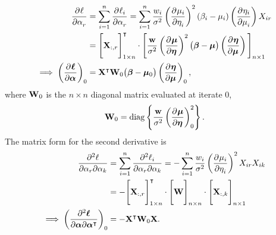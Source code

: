 \begin{align*}
  \frac{\partial^{} \ell}{\partial \alpha_r^{} } &= \sum_{i=1}^n \frac{\partial^{} \ell_i}{\partial \alpha_r^{} } = \sum_{i=1}^n \frac{w_i}{\sigma^2} \left( \frac{\partial^{} \mu_i}{\partial \eta_i^{} } \right)^2 \left(\beta_i - \mu_i\right) \left( \frac{\partial^{} \eta_i}{\partial \mu_i^{} } \right) X_{ir} \\
  &= \Bigg[ \mathbf{X}_{:,r} \Bigg]_{1 \times n}^\intercal \cdot \Bigg[ \frac{\mathbf{w}}{\sigma^2} \left( \frac{\partial^{} \bm{\mu}}{\partial \bm{\eta}^{} } \right)^2 \big(\bm{\beta} - \bm{\mu}\big) \left( \frac{\partial^{} \bm{\eta}}{\partial \bm{\mu}^{} } \right) \Bigg]_{n \times 1} \\
  \implies \left( \frac{\partial^{} \bm{\ell}}{\partial \bm{\alpha}^{} } \right)_0 &= \mathbf{X}^\intercal \mathbf{W}_0 \big(\bm{\beta} - \bm{\mu}_0\big) \left( \frac{\partial^{} \bm{\eta}}{\partial \bm{\mu}^{} } \right)_0,
\end{align*}
where $\mathbf{W}_0$ is the $n \times n$ diagonal matrix evaluated at iterate 0,
\begin{align*}
  \mathbf{W}_0 = \mathrm{diag}\left\{ \frac{\mathbf{w}}{\sigma^2} \left( \frac{\partial^{} \bm{\mu}}{\partial \bm{\eta}^{} } \right)_0^2 \right\}.
\end{align*}
The matrix form for the second derivative is
\begin{align*}
  \frac{\partial^2 \ell}{\partial \alpha_r \partial \alpha_k} &= \sum_{i=1}^n \frac{\partial^2 \ell_i}{\partial \alpha_r \partial \alpha_k} = - \sum_{i=1}^n \frac{w_i}{\sigma^2} \left( \frac{\partial^{} \mu_i}{\partial \eta_i^{} } \right)^2 X_{ir} X_{ik} \\
  &= - \Bigg[ \mathbf{X}_{:,r} \Bigg]_{1 \times n}^\intercal \cdot \Bigg[ \mathbf{W} \Bigg]_{n \times n} \cdot \Bigg[ \mathbf{X}_{:,k} \Bigg]_{n \times 1} \\
  \implies \left( \frac{\partial^2 \bm{\ell}}{\partial \bm{\alpha} \partial \bm{\alpha}^\intercal} \right)_0 &= - \mathbf{X}^\intercal \mathbf{W}_0 \mathbf{X}.
\end{align*}

